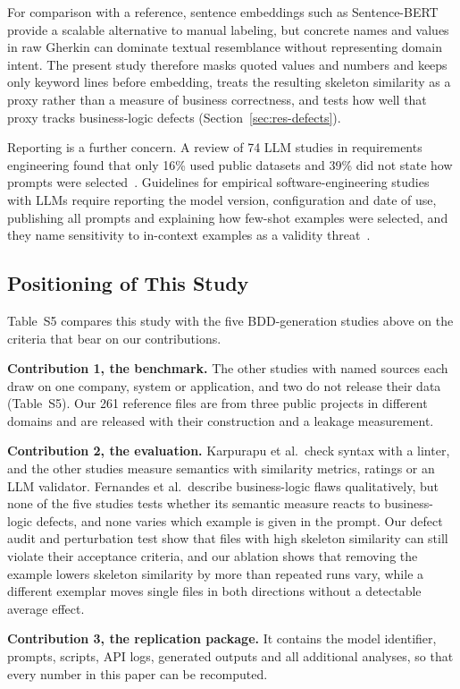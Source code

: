 For comparison with a reference, sentence embeddings such as Sentence-BERT~\cite{reimers2019} provide a scalable alternative to manual labeling, but concrete names and values in raw Gherkin can dominate textual resemblance without representing domain intent. The present study therefore masks quoted values and numbers and keeps only keyword lines before embedding, treats the resulting skeleton similarity as a proxy rather than a measure of business correctness, and tests how well that proxy tracks business-logic defects (Section~\ref{sec:res-defects}).

Reporting is a further concern. A review of 74 LLM studies in requirements engineering found that only 16\% used public datasets and 39\% did not state how prompts were selected~\cite{zadenoori2025}. Guidelines for empirical software-engineering studies with LLMs require reporting the model version, configuration and date of use, publishing all prompts and explaining how few-shot examples were selected, and they name sensitivity to in-context examples as a validity threat~\cite{baltes2026guidelines}.

\subsection{Positioning of This Study}

Table~S5 compares this study with the five BDD-generation studies above on the criteria that bear on our contributions.


\textbf{Contribution 1, the benchmark.} The other studies with named sources each draw on one company, system or application, and two do not release their data (Table~S5). Our 261 reference files are from three public projects in different domains and are released with their construction and a leakage measurement.

\textbf{Contribution 2, the evaluation.} Karpurapu et al.\ check syntax with a linter, and the other studies measure semantics with similarity metrics, ratings or an LLM validator. Fernandes et al.\ describe business-logic flaws qualitatively, but none of the five studies tests whether its semantic measure reacts to business-logic defects, and none varies which example is given in the prompt. Our defect audit and perturbation test show that files with high skeleton similarity can still violate their acceptance criteria, and our ablation shows that removing the example lowers skeleton similarity by more than repeated runs vary, while a different exemplar moves single files in both directions without a detectable average effect.

\textbf{Contribution 3, the replication package.} It contains the model identifier, prompts, scripts, API logs, generated outputs and all additional analyses, so that every number in this paper can be recomputed.
